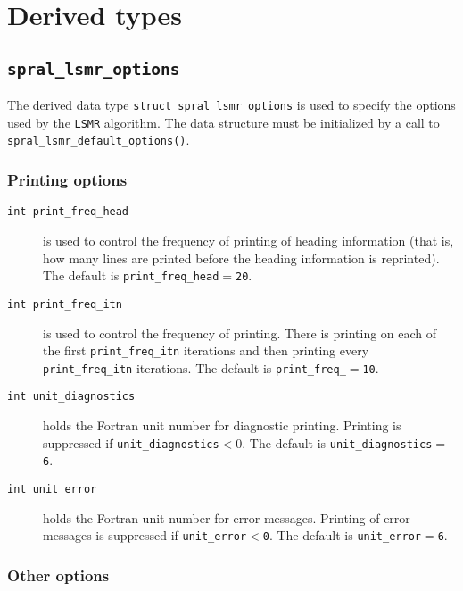 
\section{Derived types}
\subsection{\texttt{spral\_lsmr\_options}}
\label{LSMR:type:options}

The derived data type {\tt struct spral\_lsmr\_options} is used to specify the
options used by the \texttt{LSMR} algorithm. The data structure must be
initialized by a call to \texttt{spral\_lsmr\_default\_options()}.

\subsubsection*{Printing options}

\begin{description}

\item[\texttt{int print\_freq\_head}]
is used to control the frequency of printing 
of heading information (that is, how many
lines are printed before the heading information is reprinted). 
The default is {\tt print\_freq\_head$=$\tt 20}.

\item[\texttt{int print\_freq\_itn}]
is used to control the frequency of printing.
There is printing on each of the first {\tt print\_freq\_itn} iterations 
and then printing  every {\tt print\_freq\_itn}
iterations.
The default is {\tt print\_freq\_$=$\tt 10}.



\item[\texttt{int unit\_diagnostics}] holds the Fortran
unit number for diagnostic printing. Printing is suppressed if
{\tt unit\_diagnostics$<0$}.
The default is {\tt unit\_diagnostics$=$6}.

\item[\texttt{int unit\_error}] holds the Fortran
unit number for error messages.
Printing of error messages
is suppressed if {\tt unit\_error$<$0}.
The default is {\tt unit\_error$=$6}.


\end{description}



\subsubsection*{Other options}

